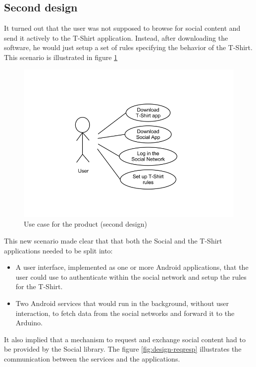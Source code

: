 \subsection{Second design}
It turned out that the user was not supposed to browse for social content and send it actively
to the T-Shirt application. Instead, after downloading the software, he would just setup a set of rules
specifying the behavior of the T-Shirt. This scenario is illustrated in figure \ref{fig:design-usecase2}

\begin{figure}[h!]
\centering \includegraphics[scale=0.35]{img/design-usecase2}
\caption{Use case for the product (second design)}
\label{fig:design-usecase2}
\end{figure}

This new scenario made clear that that both the Social and the T-Shirt applications needed to
be split into:

\begin{itemize}
\item A user interface, implemented as one or more Android applications, that the user could use to
authenticate within the social network and setup the rules for the T-Shirt.
\item Two Android services that would run in the background, without user interaction,
to fetch data from the social networks and forward it to the Arduino.
\end{itemize}

It also implied that a mechanism to request and exchange social content had to be provided
by the Social library. The figure \ref{fig:design-reqresp} illustrates the communication between
the services and the applications.

